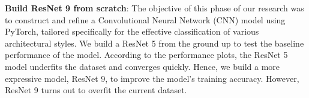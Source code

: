 \documentclass{article}
\begin{document}

\textbf{Build ResNet 9 from scratch}: The objective of this phase of our research was to construct and refine a Convolutional Neural Network (CNN) model using PyTorch, tailored specifically for the effective classification of various architectural styles. We build a ResNet 5 from the ground up to test the baseline performance of the model. According to the performance plots, the ResNet 5 model underfits the dataset and converges quickly. Hence, we build a more expressive model, ResNet 9, to improve the model's training accuracy. However, ResNet 9 turns out to overfit the current dataset.
\end{document}

